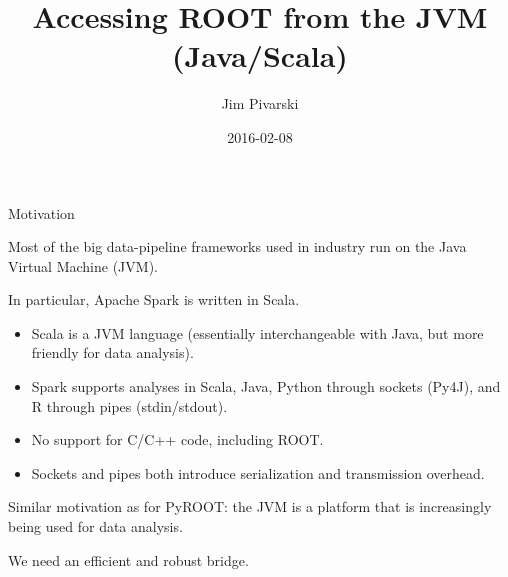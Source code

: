 \documentclass{beamer}
\title[2016-02-08-ROOT-JVM-firsttalk]{Accessing ROOT from the JVM (Java/Scala)}
\author{Jim Pivarski}
\date{2016-02-08}
\begin{document}
\begin{frame}
  \titlepage
\end{frame}


\begin{frame}{Motivation}
\begin{block}{}
Most of the big data-pipeline frameworks used in industry run on the Java Virtual Machine (JVM).
\end{block}

\begin{block}{}
\vspace{-\baselineskip}
In particular, Apache Spark is written in Scala.
\begin{itemize}
\item Scala is a JVM language (essentially interchangeable with Java, but more friendly for data analysis).
\item Spark supports analyses in Scala, Java, Python through sockets (Py4J), and R through pipes (stdin/stdout).
\item No support for C/C++ code, including ROOT.
\item Sockets and pipes both introduce serialization and transmission overhead.
\end{itemize}
\end{block}

\begin{block}{}
\vspace{-\baselineskip}
Similar motivation as for PyROOT: the JVM is a platform that is increasingly being used for data analysis.

\vspace{0.5\baselineskip}
We need an efficient and robust bridge.
\end{block}
\end{frame}
\end{document}
